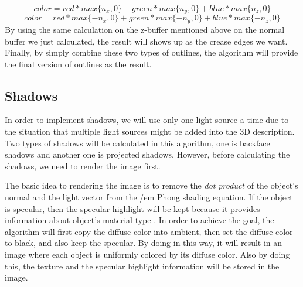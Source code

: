 \documentclass{acmsiggraph}               %
\begin{document}
\begin{equation}
color= red * max\{n_x, 0\} + green * max\{n_y, 0\} + blue * max\{n_z, 0\}
\end{equation}
\begin{equation}
color= red * max\{-n_x, 0\} + green * max\{-n_y, 0\} + blue * max\{-n_z, 0\}
\end{equation}
By using the same calculation on the z-buffer mentioned above on the normal buffer we just calculated, the result will shows up as the crease edges we want. Finally, by simply combine these two types of outlines, the algorithm will provide the final version of outlines as the result.
\subsection{Shadows}
\label{sec:shadow}
In order to implement shadows, we will use only one light source a time due to the situation that multiple light sources might be added into the 3D description. Two types of shadows will be calculated in this algorithm, one is backface shadows and another one is projected shadows. However, before calculating the shadows, we need to render the image first. 

The basic idea to rendering the image is to remove the {\em dot product} of the object's normal and the light vector from the {/em Phong shading equation}. If the object is specular, then the specular highlight will be kept because it provides information about object's material type \cite{Decaudin:1996:CLR}. In order to achieve the goal, the algorithm will first copy the diffuse color into ambient, then set the diffuse color to black, and also keep the specular. By doing in this way, it will result in an image where each object is uniformly colored by its diffuse color. Also by doing this, the texture and the specular highlight information will be stored in the image.
\end{document}
